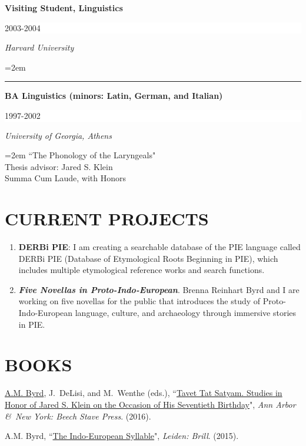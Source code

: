 \documentclass[paper=letter,fontsize=11pt,enabledeprecatedfontcommands]{scrartcl} %
\newcommand{\sepspace}{\vspace*{1em}}		%
\newcommand{\NewPart}[2]{\section*{\uppercase{#1} #2}}
\newcommand{\EducationEntry}[4]{
		\noindent \textbf{#1} \hfill      %
		\colorbox{White}{%
			\parbox{6em}{%
			\hfill\color{Black}#2}} \par  %
		\noindent \textit{#3} \par        %
		\noindent\hangindent=2em\hangafter=0 \small #4 %
		\normalsize \par}
\newcommand{\BookEntry}[4]{
		\noindent #1, ``\href{#3}{#4}", \textit{#3}.}
\begin{document}
\EducationEntry{Visiting Student, Linguistics}{2003-2004}{Harvard University}

\noindent\rule{8cm}{0.2pt}

\EducationEntry{BA Linguistics (minors: Latin, German, and Italian)}{1997-2002}{University of Georgia, Athens}
{``The Phonology of the Laryngeals"\\
Thesis advisor: Jared S. Klein\\
Summa Cum Laude, with Honors}

\NewPart{Current Projects}{}
\begin{enumerate}
\item{{\textbf{DERBi PIE}}: I am creating a searchable database of the PIE language called DERBi PIE (Database of Etymological Roots Beginning in PIE), which includes multiple etymological reference works and search functions.}
\item{{\textit{\textbf{Five Novellas in Proto-Indo-European}}}}. Brenna Reinhart Byrd and I are working on five novellas for the public that introduces the study of Proto-Indo-European language, culture, and archaeology through immersive stories in PIE.

\end{enumerate}




\NewPart{Books}{}
\begin{etaremune}
\item \BookEntry{\underline{A.M. Byrd}, J.~DeLisi, and M.~Wenthe (eds.)}{http://www.beechstave.com/tavet.htm}
{Ann Arbor \&~New York: Beech Stave Press} {Tavet Tat Satyam. Studies in Honor of Jared S. Klein on the Occasion of His Seventieth Birthday}{ (2016).}
\item \BookEntry{A.M. Byrd}{http://www.beechstave.com/tavet.htm}{Leiden: Brill}{The Indo-European Syllable}{ (2015).}
\end{etaremune}
\end{document}
